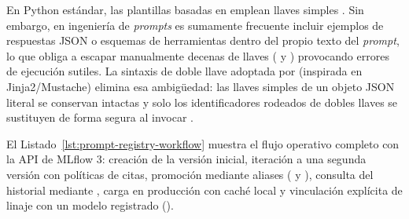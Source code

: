 \begin{infobox}
En Python estándar, las plantillas basadas en  emplean llaves simples . Sin embargo, en ingeniería de \textit{prompts} es sumamente frecuente incluir ejemplos de respuestas JSON o esquemas de herramientas dentro del propio texto del \textit{prompt}, lo que obliga a escapar manualmente decenas de llaves (\code{\{\{} y \code{\}\}}) provocando errores de ejecución sutiles. La sintaxis de doble llave  adoptada por  (inspirada en Jinja2/Mustache) elimina esa ambigüedad: las llaves simples de un objeto JSON literal se conservan intactas y solo los identificadores rodeados de dobles llaves se sustituyen de forma segura al invocar .
\end{infobox}

El Listado~\ref{lst:prompt-registry-workflow} muestra el flujo operativo completo con la API de MLflow 3: creación de la versión inicial, iteración a una segunda versión con políticas de citas, promoción mediante aliases ( y ), consulta del historial mediante , carga en producción con caché local y vinculación explícita de linaje con un modelo registrado ().

